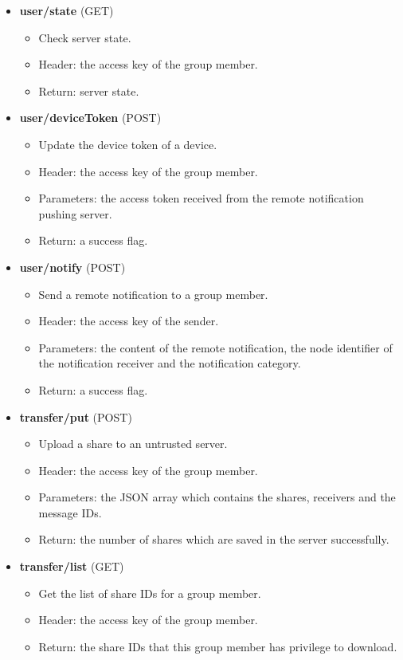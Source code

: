 \documentclass[a4paper,11pt]{report}
\begin{document}
\begin{itemize}[leftmargin=7mm]
	\item 
	\textbf{user/state} (GET)
	\begin{itemize}
		\item Check server state.
		\item Header: the access key of the group member.
		\item Return: server state.
	\end{itemize}
	\item 
	\textbf{user/deviceToken} (POST)
	\begin{itemize}
		\item Update the device token of a device.
		\item Header: the access key of the group member.
		\item Parameters: the access token received from the remote notification pushing server.
		\item Return: a success flag.
	\end{itemize}
	\item 
	\textbf{user/notify} (POST)
	\begin{itemize}
		\item Send a remote notification to a group member.
		\item Header: the access key of the sender.
		\item Parameters:  the content of the remote notification, the node identifier of the notification receiver and the notification category.
		\item Return: a success flag.
	\end{itemize}
	\item 
	\textbf{transfer/put} (POST)
	\begin{itemize}
		\item Upload a share to an untrusted server.
		\item Header: the access key of the group member.
		\item Parameters: the JSON array which contains the shares, receivers and the message IDs.
		\item Return: the number of shares which are saved in the server successfully.
	\end{itemize}
	\item 
	\textbf{transfer/list} (GET)
	\begin{itemize}
		\item Get the list of share IDs for a group member.
		\item Header: the access key of the group member.
		\item Return: the share IDs that this group member has privilege to download.

\end{itemize}
\end{itemize}
\end{document}
